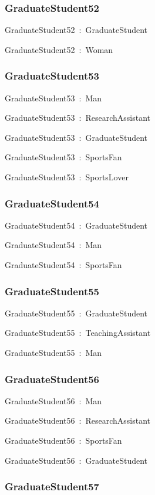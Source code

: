 \documentclass{article}
\begin{document}
\subsubsection*{GraduateStudent52}

GraduateStudent52~:~GraduateStudent

GraduateStudent52~:~Woman

\subsubsection*{GraduateStudent53}

GraduateStudent53~:~Man

GraduateStudent53~:~ResearchAssistant

GraduateStudent53~:~GraduateStudent

GraduateStudent53~:~SportsFan

GraduateStudent53~:~SportsLover

\subsubsection*{GraduateStudent54}

GraduateStudent54~:~GraduateStudent

GraduateStudent54~:~Man

GraduateStudent54~:~SportsFan

\subsubsection*{GraduateStudent55}

GraduateStudent55~:~GraduateStudent

GraduateStudent55~:~TeachingAssistant

GraduateStudent55~:~Man

\subsubsection*{GraduateStudent56}

GraduateStudent56~:~Man

GraduateStudent56~:~ResearchAssistant

GraduateStudent56~:~SportsFan

GraduateStudent56~:~GraduateStudent

\subsubsection*{GraduateStudent57}
\end{document}
